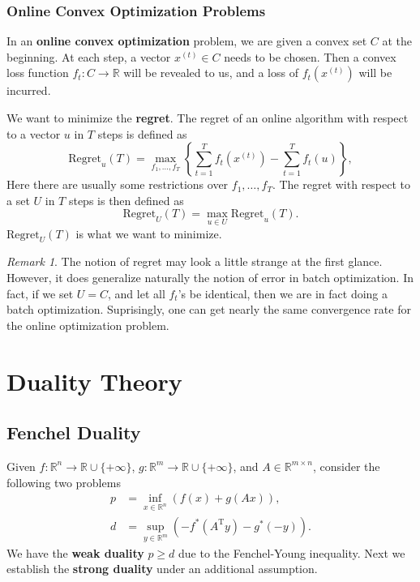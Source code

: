 \documentclass[openany]{book}
\theoremstyle{definition}
\theoremstyle{remark}
\newtheorem*{remark}{Remark}
\begin{document}
\subsection{Online Convex Optimization Problems}
In an \textbf{online convex optimization} problem, we are given a convex set $C$ at the beginning. At each step, a vector $x^{(t)}\in C$ needs to be chosen. Then a convex loss function $f_t:C\to \mathbb{R}$ will be revealed to us, and a loss of $f_t(x^{(t)})$ will be incurred.

We want to minimize the \textbf{regret}. The regret of an online algorithm with respect to a vector $u$ in $T$ steps is defined as
\begin{equation}\label{OCORegretSingle}
    \mathrm{Regret}_u(T)=\max_{f_1,\ldots,f_T}\left\{\sum_{t=1}^{T}f_t(x^{(t)})-\sum_{t=1}^{T}f_t(u)\right\},
\end{equation}
Here there are usually some restrictions over $f_1,\ldots,f_T$. The regret with respect to a set $U$ in $T$ steps is then defined as
\begin{equation}\label{OCORegretSet}
    \mathrm{Regret}_U(T)=\max_{u\in U}\mathrm{Regret}_u(T).
\end{equation}
$\mathrm{Regret}_U(T)$ is what we want to minimize.
\begin{remark}
    The notion of regret may look a little strange at the first glance. However, it does generalize naturally the notion of error in batch optimization. In fact, if we set $U=C$, and let all $f_t$'s be identical, then we are in fact doing a batch optimization. Suprisingly, one can get nearly the same convergence rate for the online optimization problem.
\end{remark}

\chapter{Duality Theory}
\section{Fenchel Duality}
Given $f:\mathbb{R}^n\to \mathbb{R}\cup\{+\infty\}$, $g:\mathbb{R}^m\to \mathbb{R}\cup\{+\infty\}$, and $A\in \mathbb{R}^{m\times n}$, consider the following two problems
\begin{align}
    p & =\inf_{x\in \mathbb{R}^n}\left(f(x)+g(Ax)\right), \label{FenchelPrimal}\\
    d & =\sup_{y\in \mathbb{R}^m}\left(-f^*(A^{\mathrm{T}}y)-g^*(-y)\right). \label{FenchelDual}
\end{align}
We have the \textbf{weak duality} $p\ge d$ due to the Fenchel-Young inequality. Next we establish the \textbf{strong duality} under an additional assumption.
\end{document}
